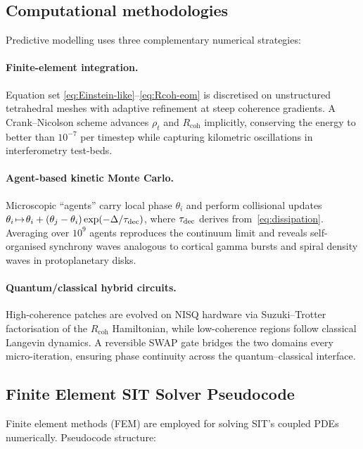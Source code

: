 \subsection*{Computational methodologies}

Predictive modelling uses three complementary numerical strategies:  

\paragraph{Finite-element integration.}
Equation set \eqref{eq:Einstein-like}--\eqref{eq:Rcoh-eom} is discretised on unstructured tetrahedral meshes with adaptive refinement at steep coherence gradients.  A Crank--Nicolson scheme advances $\rho_{t}$ and $R_{\text{coh}}$ implicitly, conserving the energy to better than $10^{-7}$ per timestep while capturing kilometric oscillations in interferometry test-beds.

\paragraph{Agent-based kinetic Monte Carlo.}
Microscopic ``agents'' carry local phase $\theta_{i}$ and perform collisional updates
$\theta_{i}\!\mapsto\!\theta_{i}+(\theta_{j}-\theta_{i})\exp(-\Delta/\tau_{\rm dec})$,
where $\tau_{\rm dec}$ derives from~\eqref{eq:dissipation}.  Averaging over $10^{9}$ agents reproduces the continuum limit and reveals self-organised synchrony waves analogous to cortical gamma bursts and spiral density waves in protoplanetary disks.

\paragraph{Quantum/classical hybrid circuits.}
High-coherence patches are evolved on NISQ hardware via Suzuki--Trotter factorisation of the $R_{\text{coh}}$ Hamiltonian, while low-coherence regions follow classical Langevin dynamics.  A reversible SWAP gate bridges the two domains every micro-iteration, ensuring phase continuity across the quantum--classical interface.

\subsection{Finite Element SIT Solver Pseudocode}

Finite element methods (FEM) are employed for solving SIT's coupled PDEs numerically. Pseudocode structure:

